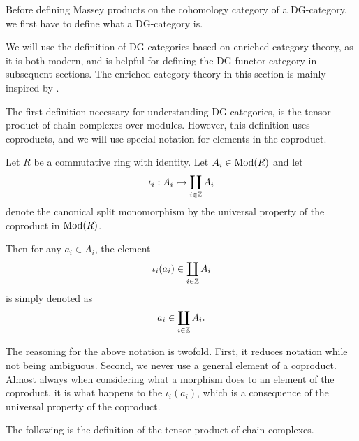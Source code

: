 Before defining Massey products on the cohomology category of a DG-category, we first have to define what a DG-category is.

We will use the definition of DG-categories based on enriched category theory, as it is both modern, and is helpful for defining the DG-functor category in subsequent sections. The enriched category theory in this section is mainly inspired by \cite[Section 6.2]{Borceux_1994}.

The first definition necessary for understanding DG-categories, is the tensor product of chain complexes over modules. However, this definition uses coproducts, and we will use special notation for elements in the coproduct.

\begin{notation}
    \label{not:coprod}
    Let \( R \) be a commutative ring with identity. Let \( A_i \in \operatorname{Mod}(R) \) and let
    \[
        \iota_i: A_i \rightarrowtail \coprod_{i \in {\mathbb{Z}}} A_i
    \]
    denote the canonical split monomorphism by the universal property of the coproduct in \( \operatorname{Mod}(R) \).

    Then for any \( a_i \in A_i \), the element
    \[
        \iota_i(a_i) \in \coprod_{i \in {\mathbb{Z}}} A_i
    \]
    is simply denoted as
    \[
        a_i \in \coprod_{i \in {\mathbb{Z}}} A_i.
    \]
\end{notation}

The reasoning for the above notation is twofold. First, it reduces notation while not being ambiguous. Second, we never use a general element of a coproduct. Almost always when considering what a morphism does to an element of the coproduct, it is what happens to the \( \iota_i(a_i) \), which is a consequence of the universal property of the coproduct.

The following is the definition of the tensor product of chain complexes.

